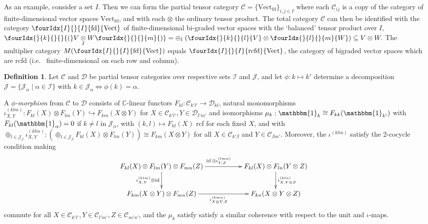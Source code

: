 \documentclass[10pt]{article}
\DeclareMathOperator{\fin}{\mathrm{fd}}
\DeclareMathOperator{\id}{id}
\DeclareMathOperator{\rcf}{\mathrm{rcfd}}
\newcommand{\C}{\mathbb{C}}
\newcommand{\CatC}{\mathcal{C}}
\newcommand{\CatD}{\mathcal{D}}
\newcommand{\CatCC}{\mathscr{C}}
\newcommand{\CatDD}{\mathscr{D}}
\newcommand{\Vectif}{\Gr{\mathrm{Vect}}{I}{I}{}{\fin}}
\newcommand{\Vectrcf}{\Gr{\mathrm{Vect}}{I}{I}{}{\rcf}}
\newcommand{\itimes}{\underset{I}{\otimes}}
\newcommand{\Vect}{\mathrm{Vect}}
\newcommand{\Unitb}{\mathbbm{1}}
\newcommand{\Gr}[5]{\fourIdx{#2}{#4}{#3}{#5}{#1}}%
\newcommand{\Gru}[3]{\Gr{#1}{}{}{#2}{#3}}
\theoremstyle{definition}
\newtheorem{Def}[Theorem]{Definition}
\newtheorem{Rem}[Theorem]{Remark}
\numberwithin{equation}{section}
\begin{document}

As an example, consider a set $I$. Then we can form the partial tensor category $\CatCC = \{\Vect_{\fin}\}_{i,j\in I}$ where each $\CatC_{ij}$ is a copy of the category of finite-dimensional vector spaces $\Vect_{\fin}$, and with each $\otimes$ the ordinary tensor product. The total category $\CatC$ can then be identified with the category $\Vectif$ of finite-dimensional bi-graded vector spaces with the `balanced' tensor product over $I$,  $\Gru{(}{k}{}V\itimes W\Gru{)}{}{m} = \oplus_l \;(\Gru{V}{k}{l}\otimes \Gru{W}{l}{m})\subseteq V\otimes W.$ The multiplier category $M(\Vectif)$ equals $\Vectrcf$, the category of bigraded vector spaces which are rcfd (i.e.~ finite-dimensional on each row and column).


\begin{Def} Let $\CatCC$ and $\CatDD$ be partial tensor categories over respective sets $\mathscr{I}$ and $\mathscr{J}$, and let $\phi: k \mapsto k'$ determine a decomposition $\mathscr{J} = \{\mathscr{J}_\alpha\mid \alpha\in \mathscr{I}\}$ with $k\in \mathscr{J}_\alpha \iff \phi(k)=\alpha$. 

A \emph{$\phi$-morphism} from $\CatCC$ to $\CatDD$ consists of $\C$-linear functors $F_{kl}: \CatC_{k'l'}\rightarrow \CatD_{kl}$, natural monomorphisms $\iota^{(klm)}_{X,Y}:F_{kl}(X) \otimes F_{lm}(Y) \hookrightarrow F_{km}(X\otimes Y)$ for $X\in \CatC_{k'l'},Y\in \CatD_{l'm'}$ and isomorphisms $\mu_{k}:  \Unitb_k \cong F_ {kk}(\Unitb_{k'})$ with $F_{kl}(\Unitb_{\alpha})= 0$ if $k\neq l$ in $\mathscr{J}_\alpha$, with $(k,l)\mapsto F_{kl}(X)$ rcf for each fixed $X$, and with $\oplus_{l\in \mathscr{J}_\beta} \iota^{(klm)}_{X,Y}: \left(\oplus_{l\in \mathscr{J}_\beta}F_{kl}(X) \otimes F_{lm}(Y)\right) \cong F_{km}(X\otimes Y)$ for all $X\in \CatC_{k'\beta}$ and $Y\in \CatC_{\beta m'}$. Moreover, the $\iota^{(klm)}$ satisfy the 2-cocycle condition making \[\xymatrix{F_{kl}(X)\otimes F_{lm}(Y)\otimes F_{mn}(Z) \ar[rr]^{\id\otimes \iota^{(lmn)}_{Y,Z}} \ar[d]_{\iota^{(klm)}_{X,Y}\otimes\id}&& F_{kl}(X)\otimes F_{ln}(Y\otimes Z)\ar[d]^{\iota^{(kln)}_{X,Y\otimes Z}}\\ F_{km}(X\otimes Y)\otimes F_{mn}(Z) \ar[rr]_{\iota^{(kmn)}_{X\otimes Y,Z}}&& F_{kn}(X\otimes Y \otimes Z)}\] commute for all $X\in \CatC_{k'l'},Y\in \CatC_{l'm'}, Z\in \CatC_{m'n'}$, and the $\mu_k$ satisfy satisfy a similar coherence with respect to the unit and $\iota$-maps. 
\end{Def}
\end{document}
